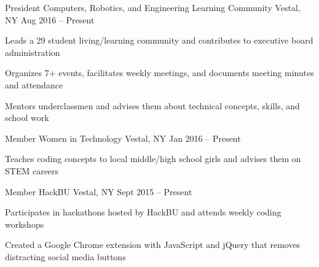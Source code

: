 \documentclass[]{awesome-cv}
\begin{document}
\begin{cventries}
	\cventry
    {President}
	{Computers, Robotics, and Engineering Learning Community}
	{Vestal, NY}
	{Aug 2016 – Present}
	{\begin{cvitems}
		\item {Leads a 29 student living/learning community and contributes to executive board administration}
		\item {Organizes 7+ events, facilitates weekly meetings, and documents meeting minutes and attendance}
        \item {Mentors underclassmen and advises them about technical concepts, skills, and school work}
	\end{cvitems}}
    \cventry
    {Member}
	{Women in Technology}
	{Vestal, NY}
	{Jan 2016 – Present}
	{\begin{cvitems}
		\item {Teaches coding concepts to local middle/high school girls and advises them on STEM careers}
	\end{cvitems}}
    \cventry
    {Member}
	{HackBU}
	{Vestal, NY}
	{Sept 2015 – Present}
	{\begin{cvitems}
		\item {Participates in hackathons hosted by HackBU and attends weekly coding workshops}
		\item {Created a Google Chrome extension with JavaScript and jQuery that removes distracting social media buttons}
	\end{cvitems}}
\end{cventries}
\vspace{-2mm}
\end{document}
